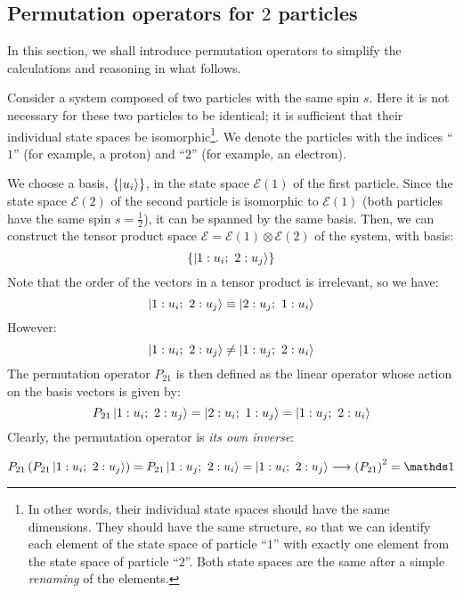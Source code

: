 \subsection{Permutation operators for $2$ particles}

In this section, we shall introduce permutation operators to simplify the calculations and reasoning in what follows.

Consider a system composed of two particles with the same spin $s$. Here it is not necessary for these two particles to be identical; it is sufficient that their individual state spaces be isomorphic\footnote{In other words, their individual state spaces should have the same dimensions. They should have the same structure, so that we can identify each element of the state space of particle ``$1$'' with exactly one element from the state space of particle ``$2$''. Both state spaces are the same after a simple \textit{renaming} of the elements.}. We denote the particles with the indices ``$1$'' (for example, a proton) and ``$2$'' (for example, an electron).

We choose a basis, $\{\ket{u_i}\}$, in the state space $\mathcal{E}(1)$ of the first particle. Since the state space $\mathcal{E}(2)$ of the second particle is isomorphic to $\mathcal{E}(1)$ (both particles have the same spin $s = \frac{1}{2}$), it can be spanned by the same basis. Then, we can construct the tensor product space $\mathcal{E} = \mathcal{E}(1) \otimes \mathcal{E}(2)$ of the system, with basis:
\begin{equation}
    \{\ket{1:u_i;\ 2: u_j}\}
\end{equation}
Note that the order of the vectors in a tensor product is irrelevant, so we have:
\begin{equation}
    \ket{1:u_i;\ 2: u_j} \equiv \ket{2:u_j;\ 1: u_i}
\end{equation}
However:
\begin{equation}
    \ket{1:u_i;\ 2: u_j} \neq \ket{1:u_j;\ 2: u_i}
\end{equation}
The permutation operator $P_{21}$ is then defined as the linear operator whose action on the basis vectors is given by:
\begin{equation}
    P_{21}\ket{1:u_i;\ 2: u_j} = \ket{2:u_i;\ 1: u_j} = \ket{1: u_j;\ 2:u_i}
\end{equation} 
Clearly, the permutation operator is \textit{its own inverse}:

\begin{equation}
    P_{21}\left(P_{21}\ket{1:u_i;\ 2: u_j}\right) = P_{21}\ket{1: u_j;\ 2:u_i} = \ket{1:u_i;\ 2: u_j} \longrightarrow \left(P_{21}\right)^2 = \Imat
\end{equation} 

